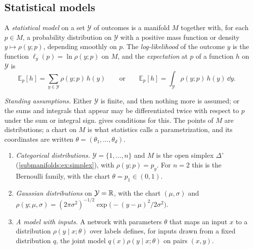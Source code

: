 \begin{notechapter}
\section{Statistical models}\label{natural-gradient:sec:models}

\begin{definition}\label{natural-gradient:def:model}
A \emph{statistical model} on a set $\mathcal Y$ of outcomes is a
manifold $M$ together with, for each $p\in M$, a probability distribution
on $\mathcal Y$ with a positive mass function or density
$y\mapsto\rho(y; p)$, depending smoothly on $p$. The
\emph{log-likelihood} of the outcome $y$ is the function
$\ell_y(p) = \ln\rho(y; p)$ on $M$, and the \emph{expectation} at $p$ of
a function $h$ on $\mathcal Y$ is
\[
  \mathbb E_p[h] = \sum_{y\in\mathcal Y}\rho(y; p)\,h(y)
  \qquad\text{or}\qquad
  \mathbb E_p[h] = \int_{\mathcal Y}\rho(y; p)\,h(y)\,\dd y .
\]
\end{definition}

\emph{Standing assumptions.} Either $\mathcal Y$ is finite, and then
nothing more is assumed; or the sums and integrals that appear may be
differentiated twice with respect to $p$ under the sum or integral sign.
 gives conditions for this. The points of $M$
are distributions; a chart on $M$ is what statistics calls a
parametrization, and its coordinates are written
$\theta = (\theta_1,\dots,\theta_d)$.

\begin{example}\label{natural-gradient:ex:models}
\begin{enumerate}[nosep]
  \item \emph{Categorical distributions.} $\mathcal Y = \{1,\dots,n\}$
        and $M$ is the open simplex $\Delta^\circ$
        (\cref{submanifolds:ex:simplex}), with $\rho(y; p) = p_y$. For
        $n = 2$ this is the Bernoulli family, with the chart
        $\theta = p_1\in(0, 1)$.
  \item \emph{Gaussian distributions} on $\mathcal Y = \mathbb{R}$, with the
        chart $(\mu, \sigma)$ and
        $\rho(y; \mu, \sigma)
        = (2\pi\sigma^2)^{-1/2}\exp\bigl(-(y - \mu)^2/2\sigma^2\bigr)$.
  \item \emph{A model with inputs.} A network with parameters $\theta$
        that maps an input $x$ to a distribution $\rho(y\mid x; \theta)$
        over labels defines, for inputs drawn from a fixed distribution
        $q$, the joint model $q(x)\rho(y\mid x; \theta)$ on pairs
        $(x, y)$.
\end{enumerate}
\end{example}


\end{notechapter}
